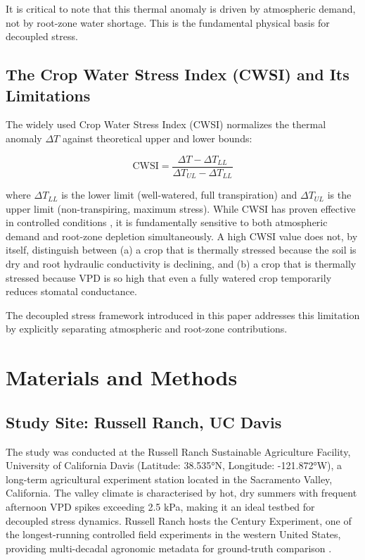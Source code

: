 \documentclass[review,12pt]{elsarticle}
\begin{document}
It is critical to note that this thermal anomaly is driven by atmospheric demand, not by root-zone water shortage. This is the fundamental physical basis for decoupled stress.

\subsection{The Crop Water Stress Index (CWSI) and Its Limitations}
\label{subsec:cwsi}

The widely used Crop Water Stress Index (CWSI) \citep{idso1981normalizing} normalizes the thermal anomaly $\Delta T$ against theoretical upper and lower bounds:

\begin{equation}
\text{CWSI} = \frac{\Delta T - \Delta T_{LL}}{\Delta T_{UL} - \Delta T_{LL}}
\label{eq:cwsi}
\end{equation}

\noindent where $\Delta T_{LL}$ is the lower limit (well-watered, full transpiration) and $\Delta T_{UL}$ is the upper limit (non-transpiring, maximum stress). While CWSI has proven effective in controlled conditions \citep{gonzalez2012thermal, bellvert2016airborne}, it is fundamentally sensitive to both atmospheric demand and root-zone depletion simultaneously. A high CWSI value does not, by itself, distinguish between (a) a crop that is thermally stressed because the soil is dry and root hydraulic conductivity is declining, and (b) a crop that is thermally stressed because VPD is so high that even a fully watered crop temporarily reduces stomatal conductance.

The decoupled stress framework introduced in this paper addresses this limitation by explicitly separating atmospheric and root-zone contributions.

\section{Materials and Methods}
\label{sec:methods}

\subsection{Study Site: Russell Ranch, UC Davis}
\label{subsec:site}

The study was conducted at the Russell Ranch Sustainable Agriculture Facility, University of California Davis (Latitude: 38.535°N, Longitude: -121.872°W), a long-term agricultural experiment station located in the Sacramento Valley, California. The valley climate is characterised by hot, dry summers with frequent afternoon VPD spikes exceeding 2.5 kPa, making it an ideal testbed for decoupled stress dynamics. Russell Ranch hosts the Century Experiment, one of the longest-running controlled field experiments in the western United States, providing multi-decadal agronomic metadata for ground-truth comparison \citep{gerhards2019challenges}.
\end{document}
